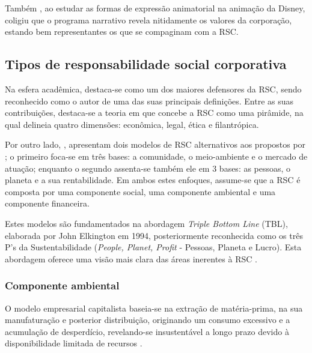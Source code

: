 \documentclass[portuguese]{textolivre}
\begin{document}
Também \textcite{silva_junior_formas_2017}, ao estudar as formas de expressão animatorial na animação da Disney, coligiu que o programa narrativo revela nitidamente os valores da corporação, estando bem representantes os que se compaginam com a RSC. 


\subsection{Tipos de responsabilidade social corporativa}\label{sec-conduta}
Na esfera acadêmica, \textcite{carroll_carrolls_2016} destaca-se como um dos maiores defensores da RSC, sendo reconhecido como o autor de uma das suas principais definições. Entre as suas contribuições, destaca-se a teoria em que concebe a RSC como uma pirâmide, na qual delineia quatro dimensões: econômica, legal, ética e filantrópica. 

Por outro lado, \textcite{kotler_marketing_2022}, apresentam dois modelos de RSC alternativos aos propostos por \textcite{carroll_carrolls_2016}; o primeiro foca-se em três bases: a comunidade, o meio-ambiente e o mercado de atuação; enquanto o segundo assenta-se também ele em 3 bases: as pessoas, o planeta e a sua rentabilidade. Em ambos estes enfoques, assume-se que a RSC é composta por uma componente social, uma componente ambiental e uma componente financeira. 

Estes modelos são fundamentados na abordagem \textit{Triple Bottom Line} (TBL), elaborada por John Elkington em 1994, posteriormente reconhecida como os três P’s da Sustentabilidade (\textit{People, Planet, Profit} - Pessoas, Planeta e Lucro).  Esta abordagem oferece uma visão mais clara das áreas inerentes à RSC \cite{ksiezak_triple_2018}.


\subsubsection{Componente ambiental}\label{sec-fmt-manuscrito}
O modelo empresarial capitalista baseia-se na extração de matéria-prima, na sua manufaturação e posterior distribuição, originando um consumo excessivo e a acumulação de desperdício, revelando-se insustentável a longo prazo devido à disponibilidade limitada de recursos \cite{lambin_global_2020}.
\end{document}
